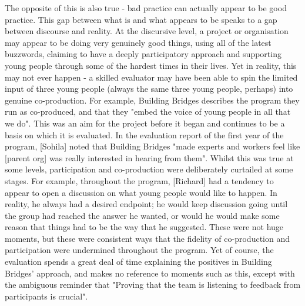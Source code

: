 The opposite of this is also true - bad practice can actually appear to be good practice. This gap between what is and what appears to be speaks to a gap between discourse and reality. At the discursive level, a project or organisation may appear to be doing very genuinely good things, using all of the latest buzzwords, claiming to have a deeply participatory approach and supporting young people through some of the hardest times in their lives. Yet in reality, this may not ever happen - a skilled evaluator may have been able to spin the limited input of three young people (always the same three young people, perhaps) into genuine co-production. For example, Building Bridges describes the program they run as co-produced, and that they "embed the voice of young people in all that we do". This was an aim for the project before it began and continues to be a basis on which it is evaluated. In the evaluation report of the first year of the program, [Sohila] noted that Building Bridges "made experts and workers feel like [parent org] was really interested in hearing from them". Whilst this was true at some levels, participation and co-production were deliberately curtailed at some stages. For example, throughout the program, [Richard] had a tendency to appear to open a discussion on what young people would like to happen. In reality, he always had a desired endpoint; he would keep discussion going until the group had reached the answer he wanted, or would he would make some reason that things had to be the way that he suggested. These were not huge moments, but these were consistent ways that the fidelity of co-production and participation were undermined throughout the program. Yet of course, the evaluation spends a great deal of time explaining the positives in Building Bridges' approach, and makes no reference to moments such as this, except with the ambiguous reminder that "Proving that the team is listening to feedback from participants is crucial".

